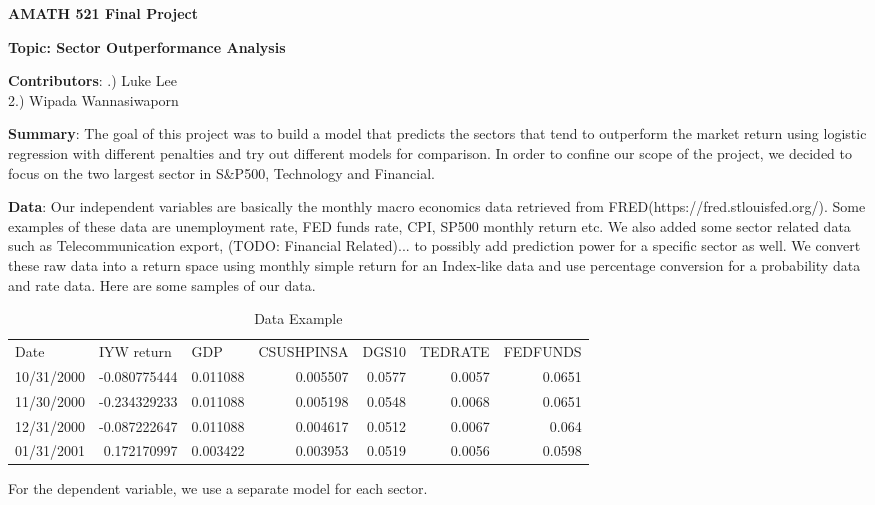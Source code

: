\documentclass[12pt]{amsart}
\begin{document}
{\bf \Large AMATH 521 Final Project}\\
\begin{center}
{\bf \Large Topic: Sector Outperformance Analysis}\\
\end{center}
\vskip 16pt \noindent
{\textbf{Contributors}: }
\vskip 8pt .) Luke Lee\\
2.) Wipada Wannasiwaporn

\vskip 8pt \noindent
{\textbf{Summary}: }
\vskip 8pt \noindent
The goal of this project was to build a model that predicts the sectors that tend to outperform the market return using logistic regression with different penalties and try out different models for comparison. In order to confine our scope of the project, we decided to focus on the two largest sector in S\&P500, Technology and Financial. 

\vskip 8pt \noindent
{\textbf{Data}: }
\vskip 8pt \noindent
Our independent variables are basically the monthly macro economics data retrieved from FRED(https://fred.stlouisfed.org/). Some examples of these data are unemployment 
rate, FED funds rate, CPI, SP500 monthly return etc. We also added some sector related data such as Telecommunication export, (TODO: Financial Related)... to possibly add prediction power for a specific sector as well. We convert these raw data into a return space using monthly simple return for an Index-like data and use percentage conversion for a probability data and rate data. Here are some samples of our data.\\

\begin{table}[htbp]
	\centering
	\caption{Data Example}
	\begin{tabular}{rrrrrrr}
		\multicolumn{1}{l}{Date} & \multicolumn{1}{l}{IYW return} & \multicolumn{1}{l}{GDP} & \multicolumn{1}{l}{CSUSHPINSA} & \multicolumn{1}{l}{DGS10} & \multicolumn{1}{l}{TEDRATE} & \multicolumn{1}{l}{FEDFUNDS} \\
		10/31/2000 & -0.080775444 & 0.011088 & 0.005507 & 0.0577 & 0.0057 & 0.0651 \\
		11/30/2000 & -0.234329233 & 0.011088 & 0.005198 & 0.0548 & 0.0068 & 0.0651 \\
		12/31/2000 & -0.087222647 & 0.011088 & 0.004617 & 0.0512 & 0.0067 & 0.064 \\
		01/31/2001 & 0.172170997 & 0.003422 & 0.003953 & 0.0519 & 0.0056 & 0.0598 \\
	\end{tabular}%
	\label{tab:addlabel}%
\end{table}%
\vskip 8pt \noindent
For the dependent variable, we use a separate model for each sector.\\
\end{document}
